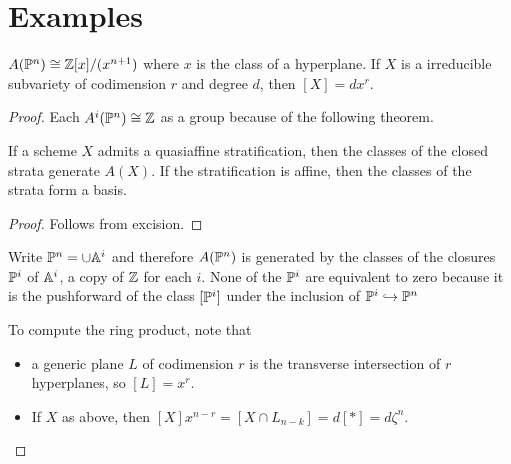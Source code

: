 \documentclass[12pt]{article}
\begin{document}
\section{Examples}
\begin{theorem}
    $A(\P^n) \cong \Z[x]/(x^{n+1})$ where $x$ is the class of a hyperplane. If $X$ is a irreducible 
    subvariety of codimension $r$ and degree $d$, then $[X] = dx^r$.
\end{theorem}

\begin{proof}
    Each $A^i(\P^n) \cong \Z$ as a group because of the following theorem.
    \begin{theorem}
        If a scheme $X$ admits a quasiaffine stratification, then the classes of the closed strata generate $A(X)$.
        If the stratification is affine, then the classes of the strata form a basis.
    \end{theorem}
    \begin{proof}
        Follows from excision.
    \end{proof}
    Write $\P^n = \cup \A^i$ and therefore $A(\P^n)$ 
    is generated by the classes of the closures $\P^i$ of $\A^i$, a copy of $\Z$ for each $i$. None of the
    $\P^i$ are equivalent to zero because it is the pushforward 
    of the class $[\P^i]$ under the inclusion of $\P^i\hookrightarrow \P^n$

    \hfill


    \hfill

    To compute the ring product, note that \begin{itemize}
        \item a generic plane $L$ of codimension $r$ is the transverse 
        intersection of $r$ hyperplanes, so $[L] = x^r$.
        \item If $X$ as above, then $[X]x^{n-r} = [X \cap L_{n-k}] = d[*] = d\zeta^n$.
    \end{itemize}
\end{proof}
\end{document}
